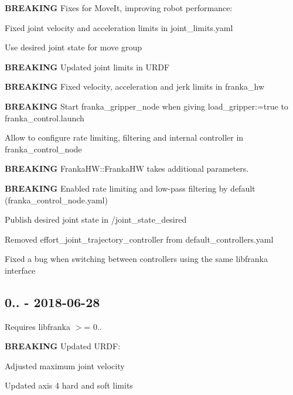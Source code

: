 \begin{DoxyItemize}
\item {\bfseries B\+R\+E\+A\+K\+I\+NG} Fixes for Move\+It, improving robot performance\+:
\begin{DoxyItemize}
\item Fixed joint velocity and acceleration limits in {\ttfamily joint\+\_\+limits.\+yaml}
\item Use desired joint state for move group
\end{DoxyItemize}
\item {\bfseries B\+R\+E\+A\+K\+I\+NG} Updated joint limits in U\+R\+DF
\item {\bfseries B\+R\+E\+A\+K\+I\+NG} Fixed velocity, acceleration and jerk limits in {\ttfamily franka\+\_\+hw}
\item {\bfseries B\+R\+E\+A\+K\+I\+NG} Start {\ttfamily franka\+\_\+gripper\+\_\+node} when giving {\ttfamily load\+\_\+gripper\+:=true} to {\ttfamily franka\+\_\+control.\+launch}
\item Allow to configure rate limiting, filtering and internal controller in {\ttfamily franka\+\_\+control\+\_\+node}
\item {\bfseries B\+R\+E\+A\+K\+I\+NG} {\ttfamily Franka\+H\+W\+::\+Franka\+HW} takes additional parameters.
\item {\bfseries B\+R\+E\+A\+K\+I\+NG} Enabled rate limiting and low-\/pass filtering by default ({\ttfamily franka\+\_\+control\+\_\+node.\+yaml})
\item Publish desired joint state in {\ttfamily /joint\+\_\+state\+\_\+desired}
\item Removed {\ttfamily effort\+\_\+joint\+\_\+trajectory\+\_\+controller} from {\ttfamily default\+\_\+controllers.\+yaml}
\item Fixed a bug when switching between controllers using the same {\ttfamily libfranka} interface
\end{DoxyItemize}

\subsection*{0.. -\/ 2018-\/06-\/28}

Requires {\ttfamily libfranka} $>$= 0..


\begin{DoxyItemize}
\item {\bfseries B\+R\+E\+A\+K\+I\+NG} Updated U\+R\+DF\+:
\begin{DoxyItemize}
\item Adjusted maximum joint velocity
\item Updated axis 4 hard and soft limits
\end{DoxyItemize}
\end{DoxyItemize}

